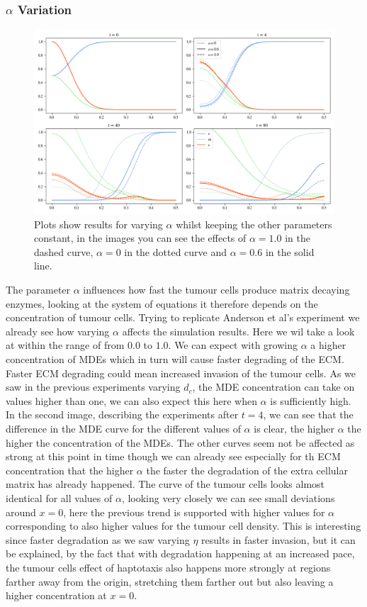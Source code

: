 \subsubsection*{$\alpha$ Variation}
\begin{figure}[h]
    \centering
    \includegraphics[width=\textwidth]{resources/images/alpha_variation.png}
    \caption{Plots show results for varying $\alpha$ whilst keeping the other parameters constant, in the images you can see the effects of $\alpha=1.0$ in the dashed curve, $\alpha=0$ in the dotted curve and $\alpha=0.6$ in the solid line.}
    \label{fig:alpha_variation}
\end{figure}
The parameter $\alpha$ influences how fast the tumour cells produce matrix decaying enzymes, looking at the system of equations it therefore depends on the concentration of tumour cells. Trying to replicate Anderson et al's experiment we already see how varying $\alpha$ affects the simulation results. Here we wil take a look at within the range of from $0.0$ to $1.0$. We can expect with growing $\alpha$ a higher concentration of MDEs which in turn will cause faster degrading of the ECM. Faster ECM degrading could mean increased invasion of the tumour cells. As we saw in the previous experiments varying $d_c$, the MDE concentration can take on values higher than one, we can also expect this here when $\alpha$ is sufficiently high.
In the second image, describing the experiments after $t=4$, we can see that the difference in the MDE curve for the different values of $\alpha$ is clear, the higher $\alpha$ the higher the concentration of the MDEs. The other curves seem not be affected as strong at this point in time though we can already see especially for th ECM concentration that the higher $\alpha$ the faster the degradation of the extra cellular matrix has already happened. The curve of the tumour cells looks almost identical for all values of $\alpha$, looking very closely we can see small deviations around $x=0$, here the previous trend is supported with higher values for $\alpha$ corresponding to also higher values for the tumour cell density. This is interesting since faster degradation as we saw varying $\eta$ results in faster invasion, but it can be explained, by the fact that with degradation happening at an increased pace, the tumour cells effect of haptotaxis also happens more strongly at regions farther away from the origin, stretching them farther out but also leaving a higher concentration at $x=0$.
